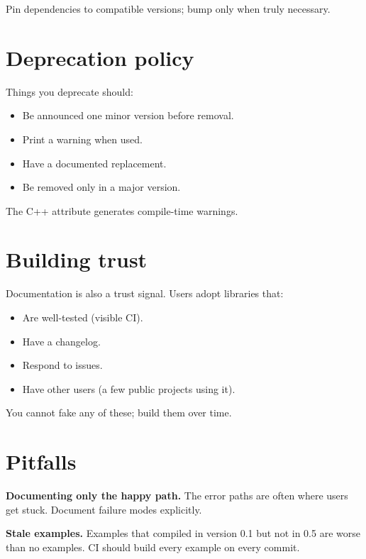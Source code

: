 Pin dependencies to compatible versions; bump  only
when truly necessary.

\section{Deprecation policy}

Things you deprecate should:

\begin{itemize}[leftmargin=*]
  \item Be announced one minor version before removal.
  \item Print a warning when used.
  \item Have a documented replacement.
  \item Be removed only in a major version.
\end{itemize}

The C++ attribute 
generates compile-time warnings.

\section{Building trust}

Documentation is also a trust signal. Users adopt libraries
that:

\begin{itemize}[leftmargin=*]
  \item Are well-tested (visible CI).
  \item Have a changelog.
  \item Respond to issues.
  \item Have other users (a few public projects using it).
\end{itemize}

You cannot fake any of these; build them over time.

\section{Pitfalls}

\begin{warning}
\textbf{Documenting only the happy path.} The error paths are
often where users get stuck. Document failure modes
explicitly.
\end{warning}

\begin{warning}
\textbf{Stale examples.} Examples that compiled in version
0.1 but not in 0.5 are worse than no examples. CI should
build every example on every commit.
\end{warning}

